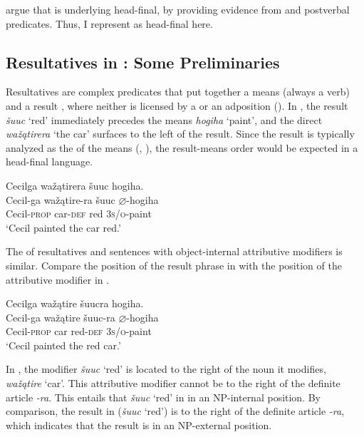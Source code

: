 \documentclass[output=paper]{LSP/langsci}
\begin{document}
\citet{JohnsonRosen2014} argue that  is underlying head-final, by providing evidence from  and postverbal predicates. Thus, I represent  as head-final here.

\subsection{Resultatives in : Some Preliminaries}

Resultatives are complex predicates that put together a means  (always a verb) and a result , where neither is licensed by a  or an adposition (\citealt{Williams2008}). In , the result \textit{šuuc} `red' immediately precedes the means \textit{hogiha} `paint', and the direct  \textit{wažątirera} `the car' surfaces to the left of the result. Since the result is typically analyzed as the  of the means (\citealt{Li1999}, \citealt{Williams2008}), the result-means order would be expected in a head-final language.

\begin{exe}

\ex \label{ex:rosen:7}\glll Cecilga wažątirera šuuc hogiha. \\
Cecil-ga  wažątire-ra šuuc {$\varnothing$}-hogiha \\
Cecil-\textsc{prop} car-\textsc{def} red \textsc{3s/o}-paint\\
\glt `Cecil painted the car red.'

\end{exe}

The  of resultatives and sentences with object-internal attributive modifiers is similar. Compare the position of the result phrase in  with the position of the attributive modifier in .

\begin{exe}
\ex\label{ex:rosen:8}
 \glll Cecilga wažątire šuucra hogiha. \\
Cecil-ga  wažątire šuuc-ra  {$\varnothing$}-hogiha\\
Cecil-\textsc{prop} car red-\textsc{def}  \textsc{3s/o}-paint\\
\glt `Cecil painted the red car.'

\end{exe}

In , the modifier \textit{šuuc} `red' is located to the right of the noun it modifies, \textit{wažątire} `car'. This attributive modifier cannot be to the right of the definite article \textit{-ra}. This entails that \textit{šuuc} `red' in  in an NP-internal position. By comparison, the result in  (\textit{šuuc} `red') is to the right of the definite article \textit{-ra}, which indicates that the result is in an NP-external position.
\end{document}
